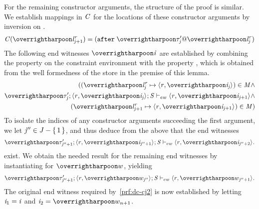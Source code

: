 \begin{nproof}
\begin{bcase}
\begin{itemize}
\begin{itemize}
\begin{itemize}
           For the remaining constructor arguments, the structure of the proof is similar.
           We establish mappings in $\mathit{C}$ for the locations of these constructor arguments
           by inversion on \tdatacon{}.
           \begin{align*}
           \CENV(\overharpoon{\locreg{\loc}{\reg}_{\indj+1}}) = \afterl{\overharpoon{\TYP'_{\indj}} \ensuremath{@} \overharpoon{\locreg{\loc}{\reg}_{\indj}}}
           \end{align*}
           The following end witnesses $\overharpoon{\ind}$ are established by combining the property
           on the constraint environment
           with the property
           ,
           which is obtained from the well formedness of the store in the premise of this lemma.
           \begin{align*}
           ((\overharpoon{\locreg{\loc}{\reg}_{\indj}} \mapsto \concreteloc{\reg}{\overharpoon{\ind_{\indj}}}{}) \in \MENV \wedge \\
                       \ewitness{\overharpoon{\TYP'_{\indj}}}{\concreteloc{\reg}{\overharpoon{\ind_{\indj}}}{}}{\STOR}{\concreteloc{\reg}{\overharpoon{\ind_{\indj+1}}}{}} \wedge \\
                       (\overharpoon{\locreg{\loc}{\reg}_{\indj+1}} \mapsto \concreteloc{\reg}{\overharpoon{\ind_{\indj+1}}}{}) \in \MENV)
           \end{align*}
           To isolate the indices of any constructor arguments succeeding the
           first argument, we let $\mathit{j}'' \in J - \{ \, 1 \,\}$, and thus deduce
           from the above that the end witnesses
           \begin{align*}
           \ewitness{\overharpoon{\TYP_{\indj''+1}'}}{\concreteloc{\reg}{\overharpoon{\ind_{\indj''+1}}}{}}{\STOR}{\concreteloc{\reg}{\overharpoon{\ind_{\indj'' + 2}}}{}}.
           \end{align*}
           exist.
           We obtain the needed result for the remaining end witnesses
           by instantiating for $\overharpoon{w}$, yielding
           \begin{align}
           \ewitness{\overharpoon{\TYP_{\indj''+1}'}}{\concreteloc{\reg}{\overharpoon{w_{\indj''}}}{}}{\STOR}{\concreteloc{\reg}{\overharpoon{w_{\indj'' + 1}}}{}} \label{prf:dc-ew-f2}.
           \end{align}
           The original end witness required by~\ref{prf:dc-cj2} is now established by letting
           $\mathit{i}_1 = \mathit{i}$ and $\ind_2 = \overharpoon{w_{n+1}}$.


\end{itemize}
\end{itemize}
\end{itemize}
\end{bcase}
\end{nproof}

